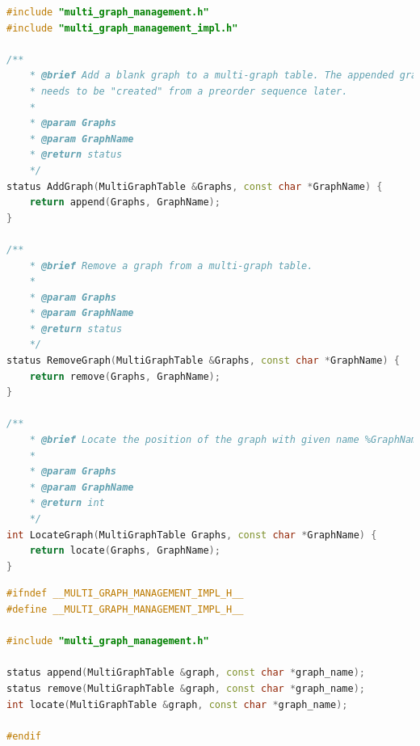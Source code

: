 \documentclass[supercite]{Experimental_Report}
\theoremstyle{definition}
\begin{document}
\begin{lstlisting}[caption={$multi\_graph\_management.cpp$}, language=C++, frame=single]
#include "multi_graph_management.h"
#include "multi_graph_management_impl.h"

/**
	* @brief Add a blank graph to a multi-graph table. The appended graph
	* needs to be "created" from a preorder sequence later.
	*
	* @param Graphs
	* @param GraphName
	* @return status
	*/
status AddGraph(MultiGraphTable &Graphs, const char *GraphName) {
	return append(Graphs, GraphName);
}

/**
	* @brief Remove a graph from a multi-graph table.
	*
	* @param Graphs
	* @param GraphName
	* @return status
	*/
status RemoveGraph(MultiGraphTable &Graphs, const char *GraphName) {
	return remove(Graphs, GraphName);
}

/**
	* @brief Locate the position of the graph with given name %GraphName.
	*
	* @param Graphs
	* @param GraphName
	* @return int
	*/
int LocateGraph(MultiGraphTable Graphs, const char *GraphName) {
	return locate(Graphs, GraphName);
}
\end{lstlisting}

\begin{lstlisting}[caption={$multi\_graph\_management\_impl.h$}, language=C++, frame=single]
#ifndef __MULTI_GRAPH_MANAGEMENT_IMPL_H__
#define __MULTI_GRAPH_MANAGEMENT_IMPL_H__

#include "multi_graph_management.h"

status append(MultiGraphTable &graph, const char *graph_name);
status remove(MultiGraphTable &graph, const char *graph_name);
int locate(MultiGraphTable &graph, const char *graph_name);

#endif
\end{lstlisting}
\end{document}
